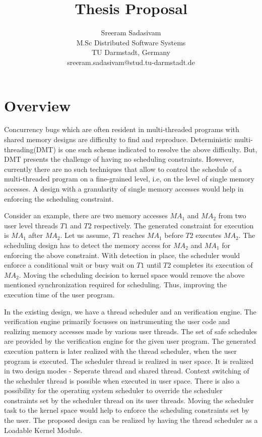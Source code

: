 \documentclass[12pt]{article}
\begin{document}
\title{\vspace{-3.5cm} Thesis Proposal}


\author{
		 Sreeram Sadasivam\\
		M.Sc Distributed Software Systems\\
		TU Darmstadt, Germany\\
		sreeram.sadasivam@stud.tu-darmstadt.de
}

\date{}


\maketitle




\section*{Overview}

Concurrency bugs which are often resident in multi-threaded programs with shared memory designs are difficulty to find and reproduce. 
Deterministic multi-threading(DMT) is one such scheme indicated to resolve the above difficulty. 
But, DMT presents the challenge of having no scheduling constraints.  
However, currently there are no such techniques that allow to control the schedule of a multi-threaded program on a fine-grained level, i.e, on the level of single memory accesses. 
A design with a granularity of single memory accesses would help in enforcing the scheduling constraint. 

Consider an example, there are two memory accesses $MA_{1}$ and $MA_{2}$ from two user level threads $T{1}$ and $T{2}$ respectively. 
The generated constraint for execution is $MA_{1}$ after $MA_{2}$. 
Let us assume, $T{1}$ reaches $MA_{1}$ before $T{2}$ executes $MA_{2}$. 
The scheduling design has to detect the memory access for $MA_{2}$ and $MA_{1}$ for enforcing the above constraint. 
With detection in place, the scheduler would enforce a conditional wait or busy wait on $T{1}$ until $T{2}$ completes its execution of $MA_{2}$. 
Moving the scheduling decision to kernel space would remove the above mentioned synchronization required for scheduling. 
Thus, improving the execution time of the user program.


In the existing design, we have a thread scheduler and an verification engine.  
The verification engine primarily focusses on instrumenting the user code and realizing memory accesses made by various user threads. 
The set of safe schedules are provided by the verification engine for the given user program. 
The generated execution pattern is later realized with the thread scheduler, when the user program is executed. 
The scheduler thread is realized in user space. 
It is realized in two design modes - Seperate thread and shared thread. 
Context switching of the scheduler thread is possible when executed in user space. 
There is also a possibility for the operating system scheduler to override the scheduler constraints set by the scheduler thread on its user threads. 
Moving the scheduler task to the kernel space would help to enforce the scheduling constraints set by the user. 
The proposed design can be realized by having the thread scheduler as a Loadable Kernel Module. 
\end{document}
